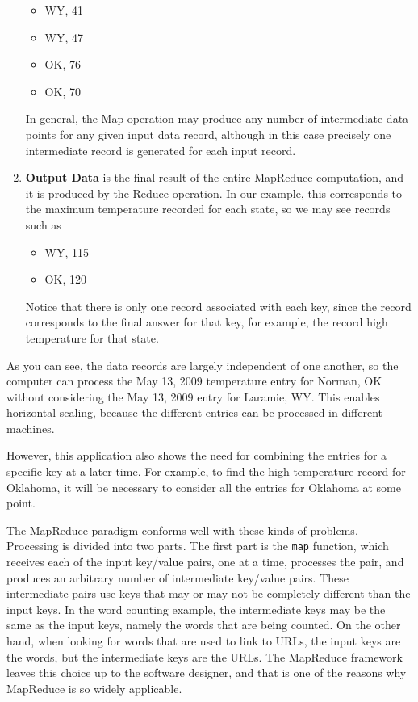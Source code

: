 \begin{enumerate}
\begin{itemize}
            \item WY, 41
            \item WY, 47
            \item OK, 76
            \item OK, 70
        \end{itemize}
        In general, the Map operation may produce any number of intermediate
        data points for any given input data record, although in this case
        precisely one intermediate record is generated for each input record.
    \item \textbf{Output Data} is the final result of the entire MapReduce computation,
        and it is produced by the Reduce operation. In our example, this
        corresponds to the maximum temperature recorded for each state, so we
        may see records such as
        \begin{itemize}
            \item WY, 115
            \item OK, 120
        \end{itemize}
        Notice that there is only one record associated with each key, since the
        record corresponds to the final answer for that key, for example, the record high
        temperature for that state.
\end{enumerate}
As you can see, the data records are largely independent of one another, so the computer 
can process the May 13, 2009 temperature entry for Norman, OK without considering the 
May 13, 2009 entry for Laramie, WY.  This enables horizontal scaling, because the
different entries can be processed in different machines.

However, this application also shows the need for combining
the entries for a specific key at a later time.  For example,
to find the high temperature record for Oklahoma, it will be
necessary to consider all the entries for Oklahoma at some
point.

The MapReduce paradigm conforms well with these kinds of problems.
Processing is divided into two parts.  
The first part is the \texttt{map} function, which receives each
of the input key/value pairs, one at a time, processes the
pair, and produces an arbitrary number of intermediate
key/value pairs.  These intermediate pairs use keys that may
or may not be completely different than the input keys.  
In the word counting example, the intermediate keys may be the same
as the input keys, namely the words that are being counted.
On the other hand, when looking for words that are used to
link to URLs, the input keys are the words, but the
intermediate keys are the URLs. The MapReduce framework leaves
this choice up to the software designer,
and that is one of the reasons why MapReduce is so widely applicable.


